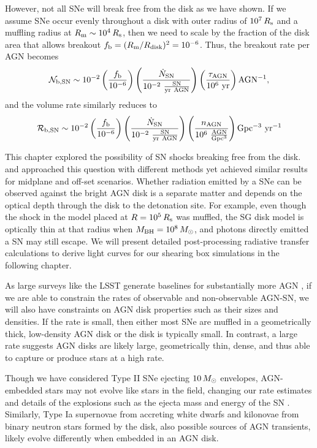 However, not all SNe will break free from the disk as we have shown.
If we assume SNe occur evenly throughout a disk with outer radius of $10^7\,R_{\rm s}$ and a muffling radius at $R_{\rm m}\sim10^4\,R_{\rm s}$, then we need to scale by the fraction of the disk area that allows breakout $f_{\rm b} = (R_{\rm m} / R_{\rm disk})^{2} = 10^{-6}$.
Thus, the breakout rate per AGN becomes
\begin{equation}
    \mathcal{N_{\rm b,SN}} \sim 10^{-2} \left( \frac{f_{\rm b}}{10^{-6}} \right) \left( \frac{\dot{N}_{\rm SN}}{\rm 10^{-2}\ \frac{SN}{yr\ AGN}} \right) \left( \frac{\tau_{\rm AGN}}{\rm 10^6\ yr} \right) \mathrm{AGN^{-1}},
\end{equation}
and the volume rate similarly reduces to
\begin{equation}
    \mathcal{R_{\rm b,SN}} \sim 10^{-2} \left( \frac{f_{\rm b}}{10^{-6}} \right) \left( \frac{\dot{N}_{\rm SN}}{\rm 10^{-2}\ \frac{SN}{yr\ AGN}} \right) \left( \frac{n_{\rm AGN}}{\rm 10^6\ \frac{AGN}{Gpc^3}} \right) \mathrm{Gpc^{-3}\ yr^{-1}}
\end{equation}

This chapter explored the possibility of SN shocks breaking free from the disk.
\citet{Moranchel+21} and \citet{Grishin+21} approached this question with different methods yet achieved similar results for midplane and off-set scenarios.
Whether radiation emitted by a SNe can be observed against the bright AGN disk is a separate matter and depends on the optical depth through the disk to the detonation site.
For example, even though the shock in the model placed at $R=10^5\,R_{\rm s}$ was muffled, the SG disk model is optically thin at that radius when $M_{\rm BH}=10^8\,M_{\odot}$, and photons directly emitted a SN may still escape.
We will present detailed post-processing radiative transfer calculations to derive light curves for our shearing box simulations in the following chapter.

As large surveys like the LSST generate baselines for substantially more AGN \citep{Kovacevic+22}, if we are able to constrain the rates of observable and non-observable AGN-SN, we will also have constraints on AGN disk properties such as their sizes and densities.
If the rate is small, then either most SNe are muffled in a geometrically thick, low-density AGN disk or the disk is typically small.
In contrast, a large rate suggests AGN disks are likely large, geometrically thin, dense, and thus able to capture or produce stars at a high rate.

Though we have considered Type II SNe ejecting $10\,M_{\odot}$ envelopes, AGN-embedded stars may not evolve like stars in the field, changing our rate estimates and details of the explosions such as the ejecta mass and energy of the SN \citep{CantielloJermynLin21, DittmannJermynCantiello23}.
Similarly, Type Ia supernovae from accreting white dwarfs and kilonovae from binary neutron stars formed by the disk, also possible sources of AGN transients, likely evolve differently when embedded in an AGN disk.

